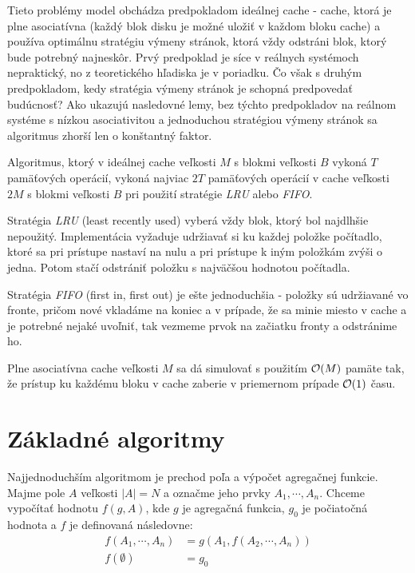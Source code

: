 Tieto problémy \obliv model obchádza predpokladom ideálnej cache - cache, ktorá je plne asociatívna (každý blok disku je možné uložiť v každom bloku cache) a používa optimálnu stratégiu výmeny stránok, ktorá vždy odstráni blok, ktorý bude potrebný najneskôr. Prvý predpoklad je síce v reálnych systémoch nepraktický, no z teoretického hľadiska je v poriadku. Čo však s druhým predpokladom, kedy stratégia výmeny stránok je schopná predpovedať budúcnosť? Ako ukazujú nasledovné lemy, bez týchto predpokladov na reálnom systéme s nízkou asociativitou a jednoduchou stratégiou výmeny stránok sa algoritmus zhorší len o konštantný faktor.

\begin{lema}
Algoritmus, ktorý v ideálnej cache veľkosti $M$ s blokmi veľkosti $B$ vykoná $T$ pamäťových operácií, vykoná najviac $2T$ pamäťových operácií v cache veľkosti $2M$ s blokmi veľkosti $B$ pri použití stratégie {\em LRU} alebo {\em FIFO}. \citep[Lemma 12]{FrigoLePr99}
\end{lema}

Stratégia {\em LRU} (least recently used) vyberá vždy blok, ktorý bol najdlhšie nepoužitý. Implementácia vyžaduje udržiavať si ku každej položke počítadlo, ktoré sa pri prístupe nastaví na nulu a pri prístupe k iným položkám zvýši o jedna. Potom stačí odstrániť položku s najväčšou hodnotou počítadla.

Stratégia {\em FIFO} (first in, first out) je ešte jednoduchšia - položky sú udržiavané vo fronte, pričom nové vkladáme na koniec a v prípade, že sa minie miesto v cache a je potrebné nejaké uvoľniť, tak vezmeme prvok na začiatku fronty a odstránime ho.

\begin{lema}
Plne asociatívna cache veľkosti $M$ sa dá simulovať s použitím $\mathcal{O}(M)$ pamäte tak, že prístup ku každému bloku v cache zaberie v priemernom prípade $\mathcal{O}(1)$ času. \citep[Lemma 16]{FrigoLePr99}
\end{lema}

\section{Základné algoritmy}

Najjednoduchším \obliv algoritmom je prechod poľa a výpočet agregačnej funkcie. Majme pole $A$ veľkosti $|A| = N$ a označme jeho prvky $A_1,\cdots,A_n$. Chceme vypočítať hodnotu $f(g, A)$, kde $g$ je agregačná funkcia, $g_0$ je počiatočná hodnota a $f$ je definovaná následovne:
\[
\begin{aligned}
f(A_1,\cdots,A_n) &= g(A_1, f(A_2,\cdots,A_n)) \\
f(\emptyset) &= g_0
\end{aligned}
\]

